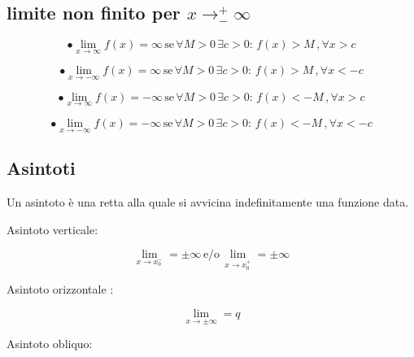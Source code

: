 \documentclass[a4paper,11pt]{article}
\begin{document}
\subsection{limite non finito per \( x \to  ^+_-\infty \) }


\begin{center}
    \[ \bullet
    \lim_{x \to \infty} f(x) = \infty \, 
    \text{se} \, 
    \forall M > 0 \, \exists c > 0 : \, 
    f(x) > M  \, ,
    \forall x > c
    \]

\end{center}


\begin{center}
    \[\bullet
    \lim_{x \to - \infty} f(x) = \infty \, 
    \text{se} \, 
    \forall M > 0 \, \exists c > 0 : \, 
    f(x) > M  \, ,
    \forall x <  -c
    \]

\end{center}



\begin{center}
    \[ \bullet
    \lim_{x \to \infty} f(x) = -\infty \, 
    \text{se} \, 
    \forall M > 0 \, \exists c > 0 : \, 
    f(x) < -M  \, ,
    \forall x > c
    \]

\end{center}


\begin{center}
    \[ \bullet
    \lim_{x \to -\infty} f(x) = -\infty \, 
    \text{se} \, 
    \forall M > 0 \, \exists c > 0 : \, 
    f(x) < -M  \, ,
    \forall x < -c
    \]

\end{center}

\subsection{Asintoti}
Un asintoto è una retta alla quale si avvicina indefinitamente una funzione data. 

Asintoto verticale:
\begin{center}
    \[  
        \lim_{x \to x_0 ^- } = \pm \infty \, \text{e/o} \, \lim_{x \to x_0 ^+} = \pm \infty
    \]
\end{center}

Asintoto orizzontale :

\begin{center}
    \[  
        \lim_{x \to \pm \infty} = q
    \]
\end{center}

Asintoto obliquo:
\end{document}
